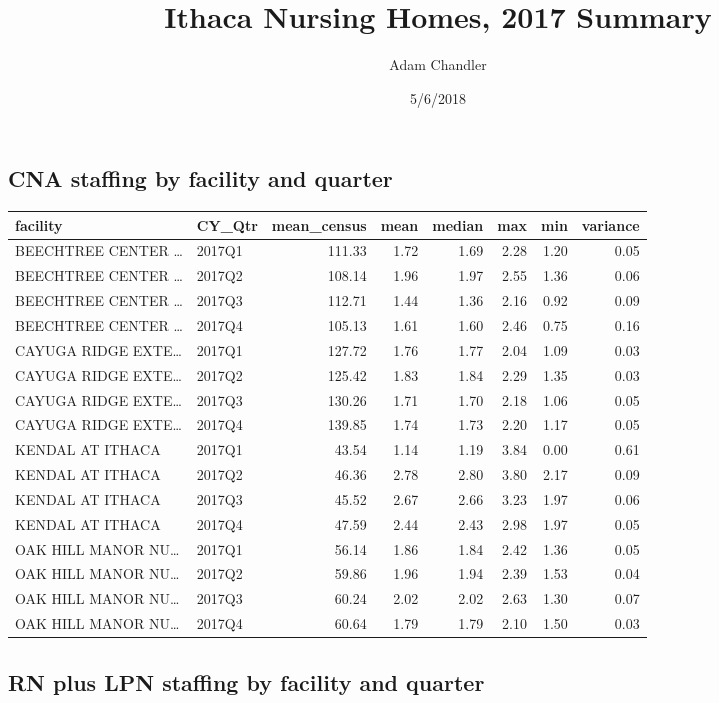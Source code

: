 \documentclass[]{article}
\title{Ithaca Nursing Homes, 2017 Summary}
\author{Adam Chandler}
\date{5/6/2018}
\begin{document}
\maketitle

\subsection{CNA staffing by facility and
quarter}\label{cna-staffing-by-facility-and-quarter}

\begin{longtable}[]{@{}llrrrrrr@{}}
\toprule
facility & CY\_Qtr & mean\_census & mean & median & max & min &
variance\tabularnewline
\midrule
\endhead
BEECHTREE CENTER \ldots{} & 2017Q1 & 111.33 & 1.72 & 1.69 & 2.28 & 1.20
& 0.05\tabularnewline
BEECHTREE CENTER \ldots{} & 2017Q2 & 108.14 & 1.96 & 1.97 & 2.55 & 1.36
& 0.06\tabularnewline
BEECHTREE CENTER \ldots{} & 2017Q3 & 112.71 & 1.44 & 1.36 & 2.16 & 0.92
& 0.09\tabularnewline
BEECHTREE CENTER \ldots{} & 2017Q4 & 105.13 & 1.61 & 1.60 & 2.46 & 0.75
& 0.16\tabularnewline
CAYUGA RIDGE EXTE\ldots{} & 2017Q1 & 127.72 & 1.76 & 1.77 & 2.04 & 1.09
& 0.03\tabularnewline
CAYUGA RIDGE EXTE\ldots{} & 2017Q2 & 125.42 & 1.83 & 1.84 & 2.29 & 1.35
& 0.03\tabularnewline
CAYUGA RIDGE EXTE\ldots{} & 2017Q3 & 130.26 & 1.71 & 1.70 & 2.18 & 1.06
& 0.05\tabularnewline
CAYUGA RIDGE EXTE\ldots{} & 2017Q4 & 139.85 & 1.74 & 1.73 & 2.20 & 1.17
& 0.05\tabularnewline
KENDAL AT ITHACA & 2017Q1 & 43.54 & 1.14 & 1.19 & 3.84 & 0.00 &
0.61\tabularnewline
KENDAL AT ITHACA & 2017Q2 & 46.36 & 2.78 & 2.80 & 3.80 & 2.17 &
0.09\tabularnewline
KENDAL AT ITHACA & 2017Q3 & 45.52 & 2.67 & 2.66 & 3.23 & 1.97 &
0.06\tabularnewline
KENDAL AT ITHACA & 2017Q4 & 47.59 & 2.44 & 2.43 & 2.98 & 1.97 &
0.05\tabularnewline
OAK HILL MANOR NU\ldots{} & 2017Q1 & 56.14 & 1.86 & 1.84 & 2.42 & 1.36 &
0.05\tabularnewline
OAK HILL MANOR NU\ldots{} & 2017Q2 & 59.86 & 1.96 & 1.94 & 2.39 & 1.53 &
0.04\tabularnewline
OAK HILL MANOR NU\ldots{} & 2017Q3 & 60.24 & 2.02 & 2.02 & 2.63 & 1.30 &
0.07\tabularnewline
OAK HILL MANOR NU\ldots{} & 2017Q4 & 60.64 & 1.79 & 1.79 & 2.10 & 1.50 &
0.03\tabularnewline
\bottomrule
\end{longtable}

\subsection{RN plus LPN staffing by facility and
quarter}\label{rn-plus-lpn-staffing-by-facility-and-quarter}
\end{document}

